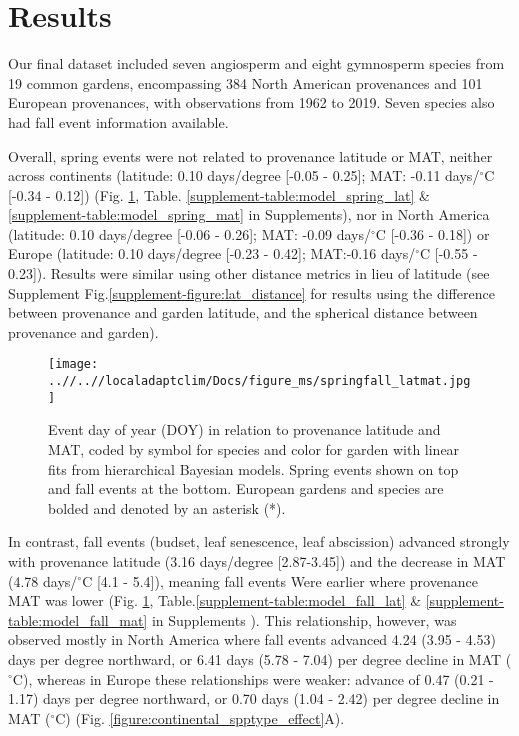\documentclass{article}
\begin{document}
\section{Results}
Our final dataset included seven angiosperm and eight gymnosperm species from 19 common gardens, encompassing 384 North American provenances and 101 European provenances, with observations from 1962 to 2019. Seven species also had fall event information available. 

Overall, spring events were not related to provenance latitude or MAT, neither across continents (latitude: 0.10 days/degree [-0.05 - 0.25]; MAT: -0.11 days/$^{\circ}$C [-0.34 - 0.12]) (Fig. \ref{figure:springfall_latmat}, Table. \ref{supplement-table:model_spring_lat} \& \ref{supplement-table:model_spring_mat} in Supplements), nor in North America (latitude: 0.10 days/degree [-0.06 - 0.26]; MAT: -0.09 days/$^{\circ}$C [-0.36 - 0.18]) or Europe (latitude: 0.10 days/degree [-0.23 - 0.42]; MAT:-0.16 days/$^{\circ}$C [-0.55 - 0.23]). Results were similar using other distance metrics in lieu of latitude (see Supplement Fig.\ref{supplement-figure:lat_distance} for results using the difference between provenance and garden latitude, and the spherical distance between provenance and garden).

\begin{figure}[!h] 
    \centering
 \texttt{[image: ..//..//localadaptclim/Docs/figure\_ms/springfall\_latmat.jpg]}
    \caption{Event day of year (DOY) in relation to provenance latitude and MAT, coded by symbol for species and color for garden with linear fits from hierarchical Bayesian models. Spring events shown on top and fall events at the bottom. European gardens and species are bolded and denoted by an asterisk (*). } 
    \label{figure:springfall_latmat}
\end{figure}


In contrast, fall events (budset, leaf senescence, leaf abscission) advanced strongly with provenance latitude (3.16 days/degree [2.87-3.45]) and the decrease in MAT (4.78 days/$^{\circ}$C [4.1 - 5.4]), meaning fall events Were earlier where provenance MAT was lower (Fig. \ref{figure:springfall_latmat}, Table.\ref{supplement-table:model_fall_lat} \& \ref{supplement-table:model_fall_mat} in Supplements ). This relationship, however, was observed mostly in North America where fall events advanced 4.24 (3.95 - 4.53) days per degree northward, or 6.41 days (5.78 - 7.04) per degree decline in MAT ($^{\circ}$C), whereas in Europe these relationships were weaker: advance of 0.47 (0.21 - 1.17) days per degree northward, or 0.70 days (1.04 - 2.42) per degree decline in MAT ($^{\circ}$C) (Fig. \ref{figure:continental_spptype_effect}A).
\end{document}
